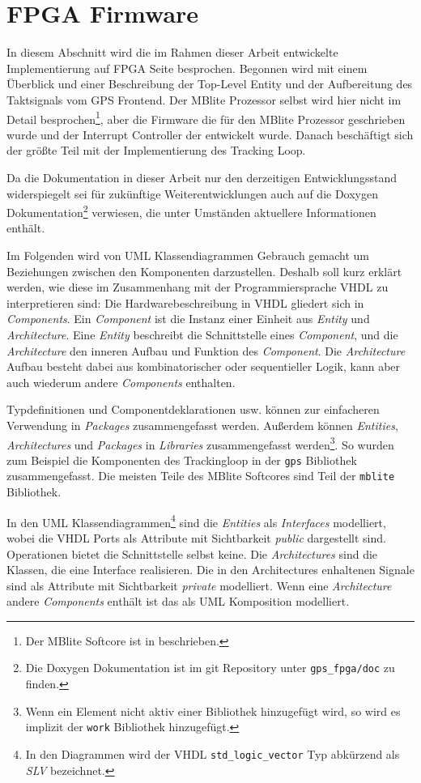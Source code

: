 \section{FPGA Firmware}
In diesem Abschnitt wird die im Rahmen dieser Arbeit entwickelte Implementierung auf FPGA Seite besprochen. Begonnen wird mit einem Überblick und einer Beschreibung der Top-Level Entity und der Aufbereitung des Taktsignals vom GPS Frontend. Der MBlite Prozessor selbst wird hier nicht im Detail besprochen\footnote{Der MBlite Softcore ist in \cite{MBliteThesis} beschrieben.}, aber die Firmware die für den MBlite Prozessor geschrieben wurde und der Interrupt Controller der entwickelt wurde. Danach beschäftigt sich der größte Teil mit der Implementierung des Tracking Loop.

Da die Dokumentation in dieser Arbeit nur den derzeitigen Entwicklungsstand widerspiegelt sei für zukünftige Weiterentwicklungen auch auf die Doxygen Dokumentation\footnote{Die Doxygen Dokumentation ist im git Repository unter \lstinline$gps_fpga/doc$ zu finden.} verwiesen, die unter Umständen aktuellere Informationen enthält. 

Im Folgenden wird von UML Klassendiagrammen Gebrauch gemacht um Beziehungen zwischen den Komponenten darzustellen. Deshalb soll kurz erklärt werden, wie diese im Zusammenhang mit der Programmiersprache VHDL zu interpretieren sind: Die Hardwarebeschreibung in VHDL gliedert sich in \emph{Components}. Ein \emph{Component} ist die Instanz einer Einheit aus \emph{Entity} und  \emph{Architecture}. Eine \emph{Entity} beschreibt die Schnittstelle eines \emph{Component}, und die \emph{Architecture} den inneren Aufbau und Funktion des \emph{Component}. Die \emph{Architecture} Aufbau besteht dabei aus kombinatorischer oder sequentieller Logik, kann aber auch wiederum andere \emph{Components} enthalten.

Typdefinitionen und Componentdeklarationen usw. können zur einfacheren Verwendung in \emph{Packages} zusammengefasst werden. Außerdem können \emph{Entities}, \emph{Architectures} und \emph{Packages} in \emph{Libraries} zusammengefasst werden\footnote{Wenn ein Element nicht aktiv einer Bibliothek hinzugefügt wird, so wird es implizit der \lstinline$work$ Bibliothek hinzugefügt.}. So wurden zum Beispiel die Komponenten des Trackingloop in der \lstinline$gps$ Bibliothek zusammengefasst. Die meisten Teile des MBlite Softcores sind Teil der \lstinline$mblite$ Bibliothek.

In den UML Klassendiagrammen\footnote{In den Diagrammen wird der VHDL \lstinline$std_logic_vector$ Typ abkürzend als \emph{SLV} bezeichnet.} sind die \emph{Entities} als  \emph{Interfaces} modelliert, wobei die VHDL Ports als Attribute mit Sichtbarkeit \emph{public} dargestellt sind. Operationen bietet die Schnittstelle selbst keine. Die \emph{Architectures} sind die Klassen, die eine Interface realisieren. Die in den Architectures enhaltenen Signale sind als Attribute mit Sichtbarkeit \emph{private} modelliert. Wenn eine \emph{Architecture} andere \emph{Components} enthält ist das als UML Komposition modelliert.

